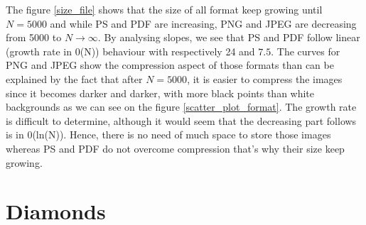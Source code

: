 \documentclass{article}
\begin{document}
The figure \ref{size_file} shows that the size of all format keep growing until $N = 5000$ and while PS and PDF are increasing, PNG and JPEG are decreasing from 5000 to $N \rightarrow \infty$. By analysing slopes, we see that PS and PDF follow linear (growth rate in 0(N)) behaviour with respectively 24 and $7.5$.
The curves for PNG and JPEG show the compression aspect of those formats than can be explained by the fact that after $N = 5000$, it is easier to compress the images since it becomes darker and darker, with more black points than white backgrounds as we can see on the figure \ref{scatter_plot_format}. The growth rate is difficult to determine, although it would seem that the decreasing part follows is in 0(ln(N)). Hence, there is no need of much space to store those images whereas PS and PDF do not overcome compression that's why their size keep growing.

\section{Diamonds}
\end{document}
